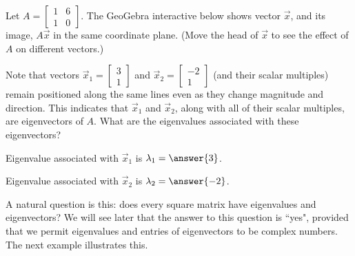 \documentclass{ximera}
\begin{document}
\begin{exploration}\label{exp:eigenvectors}
Let $A=\begin{bmatrix}1&6\\1&0\end{bmatrix}$.  The GeoGebra interactive below shows vector $\vec{x}$, and its image, $A\vec{x}$ in the same coordinate plane.  (Move the head of $\vec{x}$ to see the effect of $A$ on different vectors.)  




\begin{onlineOnly}
\begin{center}
\end{center}
\end{onlineOnly}

\begin{question}
Note that vectors $\vec{x}_1=\begin{bmatrix}3\\1\end{bmatrix}$ and $\vec{x}_2=\begin{bmatrix}-2\\1\end{bmatrix}$ (and their scalar multiples) remain positioned along the same lines even as they change magnitude and direction.  This indicates that $\vec{x}_1$ and $\vec{x}_2$, along with all of their scalar multiples, are eigenvectors of $A$.  What are the eigenvalues associated with these eigenvectors?

Eigenvalue associated with $\vec{x}_1$ is $\lambda_1=\answer{3}$.

Eigenvalue associated with $\vec{x}_2$ is $\lambda_2=\answer{-2}$.

\end{question}
\end{exploration}


A natural question is this: does every square matrix have eigenvalues and eigenvectors?  We will see later that the answer to this question is ``yes", provided that we permit eigenvalues and entries of eigenvectors to be complex numbers.  The next example illustrates this.
\end{document}
